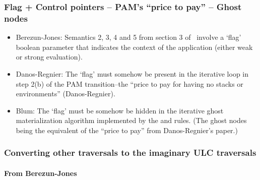 \documentclass{article}
\theoremstyle{definition}
\newcommand{\ghostlmd}{{\lambda\!\!\lambda}}
\begin{document}
\subsubsection{Flag + Control pointers -- PAM's ``price to pay''  -- Ghost nodes}
\begin{itemize}
  \item Berezun-Jones: Semantics 2, 3, 4 and 5 from section 3 of~\cite{JonesBerezunLLL} involve a `flag' boolean parameter that indicates the context of the application (either weak or strong evaluation).
  \item Danos-Regnier: The `flag' must somehow be present in the iterative loop in step 2(b) of the PAM transition--the ``price to pay for having no stacks or environments'' (Danos-Regnier).
  \item Blum: The `flag' must be somehow be hidden in the iterative ghost materialization algorithm implemented by the  and \rulenamet{Lam^\ghostlmd} rules. (The ghost nodes being the equivalent of the ``price to pay'' from Danos-Regnier's paper.)
\end{itemize}


\subsubsection{Converting other traversals to the imaginary ULC traversals}

\paragraph{From Berezun-Jones}
\end{document}

